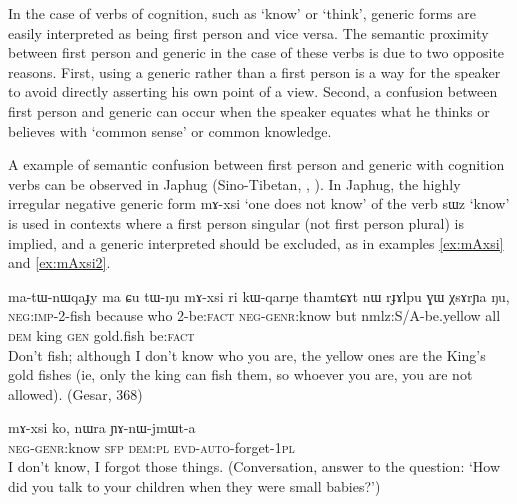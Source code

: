 \documentclass[oldfontcommands,oneside,a4paper,11pt]{article}
\newcommand{\ipa}[1]{{\phon#1}} %
\begin{document}
In the case of verbs of cognition, such as `know' or `think',  generic forms are easily interpreted as being first person and vice versa. The semantic proximity between first person and generic in the case of these verbs is due to two opposite reasons. First, using a generic rather than a first person is a way for the speaker to avoid directly asserting his own point of a view. Second, a confusion between first person and generic can occur when the speaker equates what he thinks or believes with `common sense' or common knowledge.


A example of semantic confusion between first person and generic with cognition verbs can be observed  in Japhug (Sino-Tibetan, \citealt[342]{jacques04these}, \citealt{jacques15generic}). In Japhug, the highly irregular negative generic form \ipa{mɤ-xsi} `one does not know' of the verb \ipa{sɯz} `know' is used in contexts where a first person singular (not first person plural) is  implied, and a generic interpreted should be excluded, as in examples \ref{ex:mAxsi} and \ref{ex:mAxsi2}.

\begin{exe}
 \ex \label{ex:mAxsi}
 \gll
\ipa{ma-tɯ-nɯqaɟy}  	\ipa{ma}  	\ipa{ɕu}  	\ipa{tɯ-ŋu}  	\ipa{mɤ-xsi}  	\ipa{ri} \ipa{kɯ-qarŋe}  	\ipa{thamtɕɤt}  	\ipa{nɯ}  	\ipa{rɟɤlpu}  	\ipa{ɣɯ}  	\ipa{χsɤrɲa}  	\ipa{ŋu,}  	
 \\
\textsc{neg:imp}-2-fish because who 2-be:\textsc{fact} \textsc{neg-genr}:know but nmlz:S/A-be.yellow all \textsc{dem} king \textsc{gen} gold.fish be:\textsc{fact}\\
\glt Don't fish; although I don't know who you are, the yellow ones are the King's gold fishes (ie, only the king can fish them, so whoever you are, you are not allowed). (Gesar, 368)
\end{exe}
\begin{exe}
 \ex \label{ex:mAxsi2}
 \gll
\ipa{mɤ-xsi}  	\ipa{ko,}  	\ipa{nɯra}  	\ipa{ɲɤ-nɯ-jmɯt-a}  \\
\textsc{neg-genr}:know \textsc{sfp} \textsc{dem:pl} \textsc{evd-auto}-forget-\textsc{1pl} \\
\glt I don't know, I forgot those things. (Conversation, answer to the question: `How did you talk to your children when they were small babies?')
\end{exe}
\end{document}
